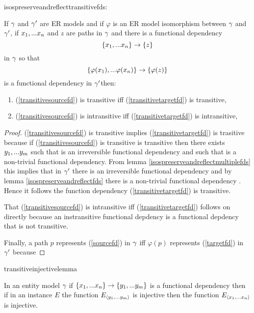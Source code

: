 isospreserveandreflecttransitivefds:
\begin{lemma}
\label{isospreserveandreflecttransitivefds}
If $\gamma$ and $\gamma'$ are ER models and  if  $\varphi$ is an ER model isomorphism between $\gamma$  and $\gamma'$,  if $x_1,...x_n$ and $z$ are paths in $\gamma$
and there is a  functional dependency
\begin{equation}
\label{transitivesourcefd}
\left\{x_1,...x_n\right\} \rightarrow \left\{z\right\}
\end{equation} 
in $\gamma$
so that
\begin{equation}
\label{transitivetargetfd}
\left\{\varphi(x_1),...\varphi(x_n)\right\} \rightarrow \left\{\varphi(z)\right\}
\end{equation}
is a functional dependency in $\gamma'$then:
\begin{enumerate}
\item (\ref{transitivesourcefd}) is  transitive iff (\ref{transitivetargetfd}) is transitive, 
\item (\ref{transitivesourcefd}) is  intransitive iff (\ref{transitivetargetfd}) is intransitive,

\end{enumerate}
\end{lemma}
\begin{proof}
\vspace{0.5cm}
(\ref{transitivesourcefd}) is transitive implies (\ref{transitivetargetfd}) 
is trasitive because if (\ref{transitivesourcefd}) is transitive is transitive then
there exists $y_1,...y_m$ such that
\fd{\xn}{\ym} is an irreversible functional dependency
and such that  is a non-trivial functional dependency.
From lemma \ref{isospreserveandreflectmultiplefds} this implies that in $\gamma'$ there is an 
\fd{\phixn}{\phiym} irreversible functional dependency \fd{\phixn}{\phiym}
and by lemma \ref{isospreserveandreflectfds} there is a non-trivial functional dependency \fd{\phiym}{\phiz}. Hence it follows
the function dependency (\ref{transitivetargetfd}) is transitive.

That (\ref{transitivesourcefd}) is  intransitive iff (\ref{transitivetargetfd}) follows on directly because an instransitive functional depdency is a functional depdency that is not transitive.

Finally, a path $p$ represents (\ref{sourcefd}) in $\gamma$ iff $\varphi(p)$ represents (\ref{targetfd}) in $\gamma'$
because

\end{proof}
transitiveinjectivelemma
\begin{lemma}
\label{transitiveinjectivelemma}
In an entity model $\gamma$ if $\left\{x_1,...x_n\right\} \rightarrow \left\{y_1,...y_{m}\right\}$ is a functional dependency then if in an instance $E$ the function $E_{\langle y_1,...y_{m}\rangle}$ is injective then the function $E_{\langle x_1,...x_n\rangle}$  is injective.
\end{lemma}
